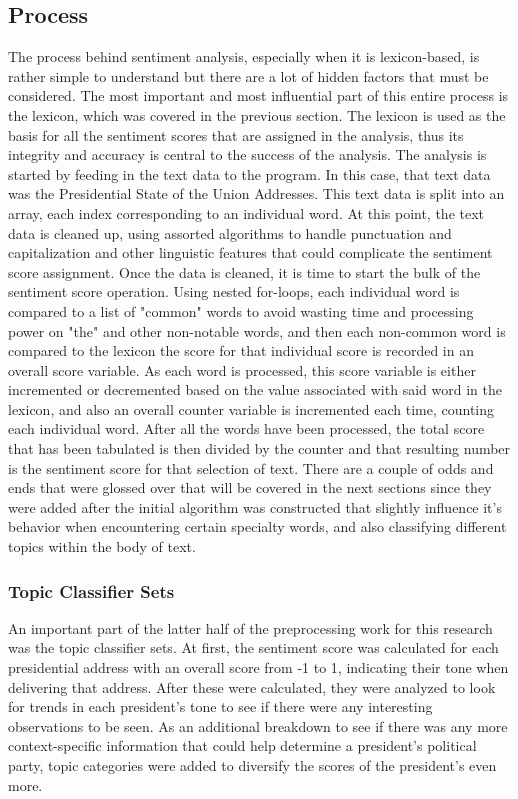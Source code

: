 \subsection{Process}
The process behind sentiment analysis, especially when it is lexicon-based, is rather simple to understand but there are a lot of hidden factors that must be considered.
The most important and most influential part of this entire process is the lexicon, which was covered in the previous section.
The lexicon is used as the basis for all the sentiment scores that are assigned in the analysis, thus its integrity and accuracy is central to the success of the analysis.
The analysis is started by feeding in the text data to the program. 
In this case, that text data was the Presidential State of the Union Addresses.
This text data is split into an array, each index corresponding to an individual word.
At this point, the text data is cleaned up, using assorted algorithms to handle punctuation and capitalization and other linguistic features that could complicate the sentiment score assignment.
Once the data is cleaned, it is time to start the bulk of the sentiment score operation.
Using nested for-loops, each individual word is compared to a list of "common" words to avoid wasting time and processing power on "the" and other non-notable words, and then each non-common word is compared to the lexicon the score for that individual score is recorded in an overall score variable.
As each word is processed, this score variable is either incremented or decremented based on the value associated with said word in the lexicon, and also an overall counter variable is incremented each time, counting each individual word.
After all the words have been processed, the total score that has been tabulated is then divided by the counter and that resulting number is the sentiment score for that selection of text.
There are a couple of odds and ends that were glossed over that will be covered in the next sections since they were added after the initial algorithm was constructed that slightly influence it's behavior when encountering certain specialty words, and also classifying different topics within the body of text.

\subsubsection{Topic Classifier Sets}
An important part of the latter half of the preprocessing work for this research was the topic classifier sets.
At first, the sentiment score was calculated for each presidential address with an overall score from -1 to 1, indicating their tone when delivering that address.
After these were calculated, they were analyzed to look for trends in each president's tone to see if there were any interesting observations to be seen.
As an additional breakdown to see if there was any more context-specific information that could help determine a president's political party, topic categories were added to diversify the scores of the president's even more.

